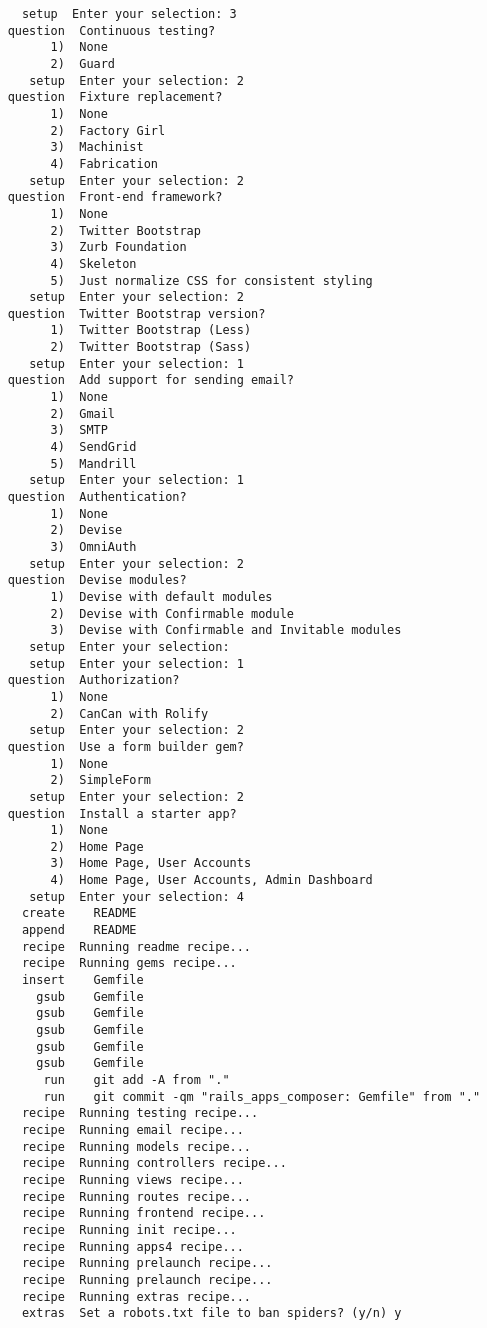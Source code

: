 \documentclass[bidi]{tufte-handout}
\begin{document}
\begin{verbatim}
      setup  Enter your selection: 3
    question  Continuous testing?
          1)  None
          2)  Guard
       setup  Enter your selection: 2
    question  Fixture replacement?
          1)  None
          2)  Factory Girl
          3)  Machinist
          4)  Fabrication
       setup  Enter your selection: 2
    question  Front-end framework?
          1)  None
          2)  Twitter Bootstrap
          3)  Zurb Foundation
          4)  Skeleton
          5)  Just normalize CSS for consistent styling
       setup  Enter your selection: 2
    question  Twitter Bootstrap version?
          1)  Twitter Bootstrap (Less)
          2)  Twitter Bootstrap (Sass)
       setup  Enter your selection: 1
    question  Add support for sending email?
          1)  None
          2)  Gmail
          3)  SMTP
          4)  SendGrid
          5)  Mandrill
       setup  Enter your selection: 1
    question  Authentication?
          1)  None
          2)  Devise
          3)  OmniAuth
       setup  Enter your selection: 2
    question  Devise modules?
          1)  Devise with default modules
          2)  Devise with Confirmable module
          3)  Devise with Confirmable and Invitable modules
       setup  Enter your selection:
       setup  Enter your selection: 1
    question  Authorization?
          1)  None
          2)  CanCan with Rolify
       setup  Enter your selection: 2
    question  Use a form builder gem?
          1)  None
          2)  SimpleForm
       setup  Enter your selection: 2
    question  Install a starter app?
          1)  None
          2)  Home Page
          3)  Home Page, User Accounts
          4)  Home Page, User Accounts, Admin Dashboard
       setup  Enter your selection: 4
      create    README
      append    README
      recipe  Running readme recipe...
      recipe  Running gems recipe...
      insert    Gemfile
        gsub    Gemfile
        gsub    Gemfile
        gsub    Gemfile
        gsub    Gemfile
        gsub    Gemfile
         run    git add -A from "."
         run    git commit -qm "rails_apps_composer: Gemfile" from "."
      recipe  Running testing recipe...
      recipe  Running email recipe...
      recipe  Running models recipe...
      recipe  Running controllers recipe...
      recipe  Running views recipe...
      recipe  Running routes recipe...
      recipe  Running frontend recipe...
      recipe  Running init recipe...
      recipe  Running apps4 recipe...
      recipe  Running prelaunch recipe...
      recipe  Running prelaunch recipe...
      recipe  Running extras recipe...
      extras  Set a robots.txt file to ban spiders? (y/n) y

\end{verbatim}
\end{document}
